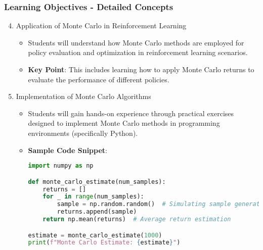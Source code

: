 \documentclass[aspectratio=169]{beamer}
\begin{document}
\begin{frame}[fragile]
    \frametitle{Learning Objectives - Detailed Concepts}
    \begin{enumerate}
        \setcounter{enumi}{3}
        \item Application of Monte Carlo in Reinforcement Learning
        \begin{itemize}
            \item Students will understand how Monte Carlo methods are employed for policy evaluation and optimization in reinforcement learning scenarios.
            \item \textbf{Key Point}: This includes learning how to apply Monte Carlo returns to evaluate the performance of different policies.
        \end{itemize}
        
        \item Implementation of Monte Carlo Algorithms
        \begin{itemize}
            \item Students will gain hands-on experience through practical exercises designed to implement Monte Carlo methods in programming environments (specifically Python).
            \item \textbf{Sample Code Snippet}:
            \begin{lstlisting}[language=Python]
import numpy as np

def monte_carlo_estimate(num_samples):
    returns = []
    for _ in range(num_samples):
        sample = np.random.random()  # Simulating sample generation
        returns.append(sample)
    return np.mean(returns)  # Average return estimation

estimate = monte_carlo_estimate(1000)
print(f"Monte Carlo Estimate: {estimate}")
            \end{lstlisting}
        \end{itemize}
    \end{enumerate}
\end{frame}
\end{document}
